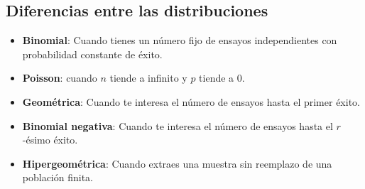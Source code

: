 \documentclass{./Probabilidad.tex}
\begin{document}
\subsection{Diferencias entre las distribuciones}
\begin{itemize}
	\item \textbf{Binomial}: Cuando tienes un número fijo de ensayos independientes con probabilidad constante de éxito.
	\item \textbf{Poisson}: cuando $n$ tiende a infinito y $p$ tiende a $0$.
	\item \textbf{Geométrica}: Cuando te interesa el número de ensayos hasta el primer éxito.
	\item \textbf{Binomial negativa}: Cuando te interesa el número de ensayos hasta el $r$-ésimo éxito.
	\item \textbf{Hipergeométrica}: Cuando extraes una muestra sin reemplazo de una población finita.
\end{itemize}
\end{document}
